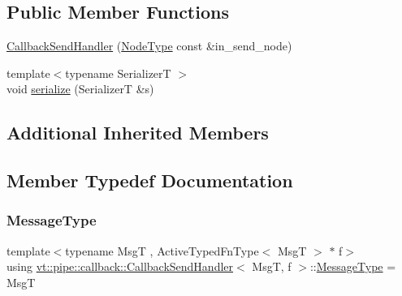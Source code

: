 \subsection*{Public Member Functions}
\begin{DoxyCompactItemize}
\item 
\hyperlink{structvt_1_1pipe_1_1callback_1_1_callback_send_handler_af1f6a9e98ca21793a1c6d0505bf65ed9}{Callback\+Send\+Handler} (\hyperlink{namespacevt_a866da9d0efc19c0a1ce79e9e492f47e2}{Node\+Type} const \&in\+\_\+send\+\_\+node)
\item 
{\footnotesize template$<$typename SerializerT $>$ }\\void \hyperlink{structvt_1_1pipe_1_1callback_1_1_callback_send_handler_ae1229f253b82ad716c9a3b0f0b675684}{serialize} (SerializerT \&s)
\end{DoxyCompactItemize}
\subsection*{Additional Inherited Members}


\subsection{Member Typedef Documentation}
\mbox{\label{structvt_1_1pipe_1_1callback_1_1_callback_send_handler_a36b875a40dee2312857aacd407d5f9d3}} 
\subsubsection{\texorpdfstring{Message\+Type}{MessageType}}
{\footnotesize\ttfamily template$<$typename MsgT , Active\+Typed\+Fn\+Type$<$ Msg\+T $>$ $\ast$ f$>$ \\
using \hyperlink{structvt_1_1pipe_1_1callback_1_1_callback_send_handler}{vt\+::pipe\+::callback\+::\+Callback\+Send\+Handler}$<$ MsgT, f $>$\+::\hyperlink{structvt_1_1pipe_1_1callback_1_1_callback_send_handler_a36b875a40dee2312857aacd407d5f9d3}{Message\+Type} =  MsgT}

\mbox{\label{structvt_1_1pipe_1_1callback_1_1_callback_send_handler_af46916844a27c29e7c6134f962d0964f}} 
